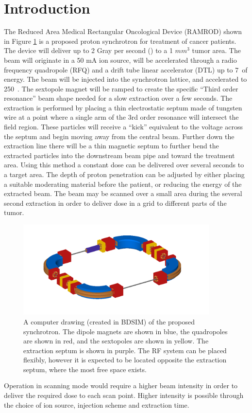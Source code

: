 \section{Introduction}

The Reduced Area Medical Rectangular Oncological Device (RAMROD) shown in Figure \ref{fig:ram} is a proposed proton synchrotron for treatment of cancer patients.  
The device will deliver up to 2
Gray per second (\gs) to a 1 $mm^3$ tumor area.  The beam will originate in a 50 mA ion source, will be accelerated through a radio frequency quadropole (RFQ) and 
a drift tube linear accelerator (DTL) up to 7~\mev of energy. The beam will be injected into the synchrotron lattice, and accelerated to 250~\mev.  The sextopole 
magnet will be ramped to create the specific ``Third order resonance'' 
beam shape needed for a slow extraction over a few seconds. The extraction is 
performed by placing a thin electrostatic septum made of tungsten wire 
at a point where a single arm of the 3rd order resonance will intersect the field region.  These
particles will receive a ``kick'' equivalent to the voltage across the septum 
and begin moving away from the central beam.  Further down the extraction line there will be a thin magnetic septum to further bend the extracted
particles into the downstream beam pipe and toward the treatment area.  Using this method a constant dose can be delivered over several seconds to a target area.  
The depth of 
proton penetration can be adjusted by either placing a suitable moderating material before the patient, or reducing the energy of the extracted beam.  The beam may be 
scanned over a small area during the several second extraction in order to deliver dose in a grid to different parts of the tumor.  
\begin{figure}[h]
  \begin{center}
    \includegraphics[width=0.9\textwidth]{ramrod.png}
    \caption{A computer drawing (created in BDSIM) of the proposed synchrotron.  The dipole magnets are shown in blue,
    the quadropoles are shown in red, and the sextopoles are shown in yellow.  The extraction septum is shown in purple. The RF system can be placed flexibly, however 
  it is expected to be located opposite the extraction septum, where the most free space exists.}
  \end{center}
  \label{fig:ram}
\end{figure}
Operation in scanning mode would require a higher beam intensity in order to deliver the required dose to each scan point.  Higher intensity is possible through the choice
of ion source, injection scheme and extraction time. 

